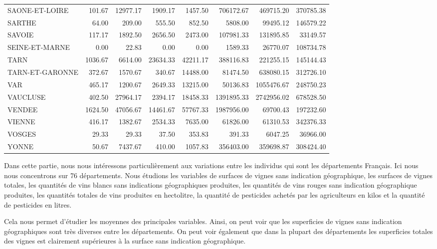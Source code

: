 \documentclass[11pt, a4paper]{article}
\begin{document}
\begin{tabular}{lrrrrrrr}
  SAONE-ET-LOIRE & 101.67 & 12977.17 & 1909.17 & 1457.50 & 706172.67 & 469715.20 & 370785.38 \\ 
  SARTHE & 64.00 & 209.00 & 555.50 & 852.50 & 5808.00 & 99495.12 & 146579.22 \\ 
  SAVOIE & 117.17 & 1892.50 & 2656.50 & 2473.00 & 107981.33 & 131895.85 & 33149.57 \\ 
  SEINE-ET-MARNE & 0.00 & 22.83 & 0.00 & 0.00 & 1589.33 & 26770.07 & 108734.78 \\
  TARN & 1036.67 & 6614.00 & 23634.33 & 42211.17 & 388116.83 & 221255.15 & 145144.43 \\ 
  TARN-ET-GARONNE & 372.67 & 1570.67 & 340.67 & 14488.00 & 81474.50 & 638080.15 & 312726.10 \\ 
  VAR & 465.17 & 1200.67 & 2649.33 & 13215.00 & 50136.83 & 1055476.67 & 248750.23 \\ 
  VAUCLUSE & 402.50 & 27964.17 & 2394.17 & 18458.33 & 1391895.33 & 2742956.02 & 678528.50 \\ 
  VENDEE & 1624.50 & 47056.67 & 14461.67 & 57767.33 & 1987956.00 & 69700.43 & 197232.60 \\ 
  VIENNE & 416.17 & 1382.67 & 2534.33 & 7635.00 & 61826.00 & 61310.53 & 342376.33 \\ 
  VOSGES & 29.33 & 29.33 & 37.50 & 353.83 & 391.33 & 6047.25 & 36966.00 \\ 
  YONNE & 50.67 & 7437.67 & 410.00 & 1057.83 & 356403.00 & 359698.87 & 308424.40 \\
   \hline
\end{tabular}
\FloatBarrier
\par
Dans cette partie, nous nous intéressons particulièrement aux variations entre les individus qui sont les départements Français. 
Ici nous nous concentrons sur 76 départements. 
Nous étudions les variables de surfaces de vignes sans indication géographique, les surfaces de vignes totales, les quantités de vins blancs sans indications géographiques produites, les quantités de vins rouges sans indication géographique produites, les quantités totales de vins produites en hectolitre, la quantité de pesticides achetés par  les agriculteurs en kilos et la quantité de pesticides en litres.
\par
Cela nous permet d’étudier les moyennes des principales variables. 
Ainsi, on peut voir que les superficies de vignes sans indication géographiques sont très diverses entre les départements. 
On peut voir également que dans la plupart des départements  les superficies totales des vignes est clairement supérieures à la surface sans indication géographique. 
\end{document}
